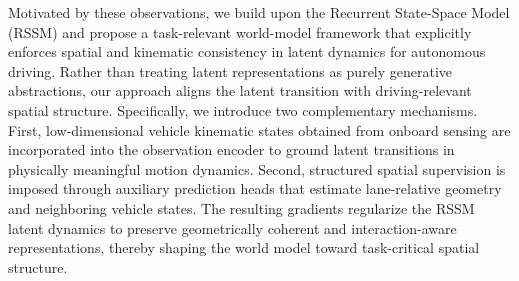 
Motivated by these observations, we build upon the Recurrent State-Space Model (RSSM) \cite{hafner2025mastering} and propose a task-relevant world-model framework that explicitly enforces spatial and kinematic consistency in latent dynamics for autonomous driving. Rather than treating latent representations as purely generative abstractions, our approach aligns the latent transition with driving-relevant spatial structure.
Specifically, we introduce two complementary mechanisms. First, low-dimensional vehicle kinematic states obtained from onboard sensing are incorporated into the observation encoder to ground latent transitions in physically meaningful motion dynamics. Second, structured spatial supervision is imposed through auxiliary prediction heads that estimate lane-relative geometry and neighboring vehicle states. The resulting gradients regularize the RSSM latent dynamics to preserve geometrically coherent and interaction-aware representations, thereby shaping the world model toward task-critical spatial structure.

